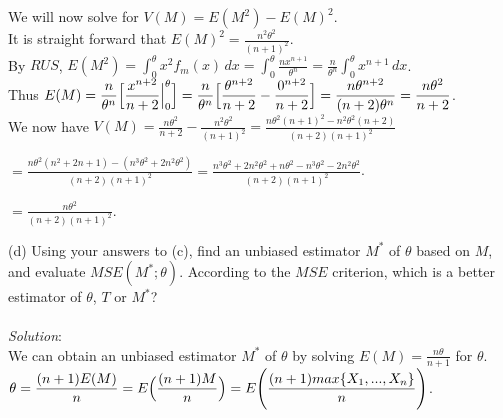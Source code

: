 \documentclass[12pt]{article}
\begin{document}
\noindent 
We will now solve for $ V(M) = E(M^{2}) - E(M)^{2} $. \\

\noindent 
It is straight forward that $ \displaystyle E(M)^{2} = \frac{n^{2}\theta^{2}}{(n + 1)^{2}} $. \\

\noindent 
By $ RUS $, $ \displaystyle E(M^{2}) = \int_{0}^{\theta} x^{2}f_{m}(x) \, dx = \int_{0}^{\theta} \frac{nx^{n+1}}{\theta^{n}} = \frac{n}{\theta^{n}} \int_{0}^{\theta} x^{n + 1} \, dx $. \\

\noindent
Thus $ \displaystyle E(M) = \frac{n}{\theta^{n}} \Bigl[ \frac{x^{n + 2}}{n + 2} \Big|_{0}^{\theta} \Bigr] = \frac{n}{\theta^{n}} \Bigl[ \frac{\theta^{n + 2}}{n + 2} - \frac{0^{n + 2}}{n + 2} \Bigr] = \frac{n\theta^{n + 2}}{(n + 2)\theta^{n}} = \frac{n\theta^{2}}{n + 2} $. \\

\noindent 
We now have $ \displaystyle V(M) = \frac{n\theta^{2}}{n + 2} - \frac{n^{2}\theta^{2}}{(n + 1)^{2}} = \frac{n\theta^{2}(n + 1)^{2} - n^{2}\theta^{2}(n + 2)}{(n + 2)(n + 1)^{2}} $ 

$ \displaystyle = \frac{n\theta^{2}(n^{2} + 2n + 1) - (n^{3}\theta^{2} + 2n^{2}\theta^{2})}{(n + 2)(n + 1)^{2}} = \frac{n^{3}\theta^{2} + 2n^{2}\theta^{2} + n\theta^{2} - n^{3}\theta^{2} - 2n^{2}\theta^{2}}{(n + 2)(n + 1)^{2}} $. 

$ \displaystyle = \frac{n\theta^{2}}{(n + 2)(n + 1)^{2}} $. \\
\newpage


(d) Using your answers to (c), find an unbiased estimator $ M^{*} $ of $ \theta $ based on $ M $, and evaluate $ MSE(M^{*}; \theta) $. According to the $ MSE $ criterion, which is a better estimator of $ \theta $, $ T $ or $ M^{*} $?  \\
\vspace{2.5mm} \\
\textit{Solution}:
\vspace{2.5mm} \\

\noindent 
We can obtain an unbiased estimator $ M^{*} $ of $ \theta $ by solving $ \displaystyle E(M) = \frac{n\theta}{n + 1} $ for $ \theta $. \\

\noindent
$ \displaystyle \theta = \frac{(n + 1)E(M)}{n} = E\Bigl( \frac{(n + 1)M}{n} \Bigr) = E\Biggl( \frac{(n + 1)max\{X_{1},...,X_{n}\}}{n} \Biggr) $. \\
\end{document}
